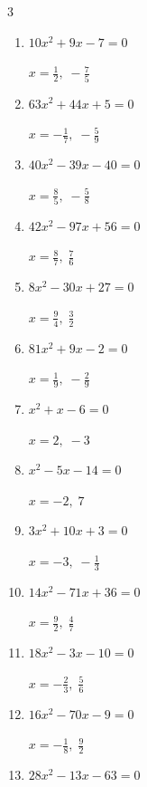 \begin{multicols}{3}
\begin{enumerate}
        $\displaystyle x=-\frac{7}{9},\; -2$

  \item $10x^{2}+9x-7=0$

        $\displaystyle x=\frac{1}{2},\; -\frac{7}{5}$

  \item $63x^{2}+44x+5=0$

        $\displaystyle x=-\frac{1}{7},\; -\frac{5}{9}$

  \item $40x^{2}-39x-40=0$

        $\displaystyle x=\frac{8}{5},\; -\frac{5}{8}$

  \item $42x^{2}-97x+56=0$

        $\displaystyle x=\frac{8}{7},\; \frac{7}{6}$

  \item $8x^{2}-30x+27=0$

        $\displaystyle x=\frac{9}{4},\; \frac{3}{2}$

  \item $81x^{2}+9x-2=0$

        $\displaystyle x=\frac{1}{9},\; -\frac{2}{9}$

  \item $x^{2}+x-6=0$

        $\displaystyle x=2,\; -3$

\columnbreak %

  \item $x^{2}-5x-14=0$

        $\displaystyle x=-2,\; 7$

  \item $3x^{2}+10x+3=0$

        $\displaystyle x=-3,\; -\frac{1}{3}$

  \item $14x^{2}-71x+36=0$

        $\displaystyle x=\frac{9}{2},\; \frac{4}{7}$

  \item $18x^{2}-3x-10=0$

        $\displaystyle x=-\frac{2}{3},\; \frac{5}{6}$

  \item $16x^{2}-70x-9=0$

        $\displaystyle x=-\frac{1}{8},\; \frac{9}{2}$

  \item $28x^{2}-13x-63=0$


\end{enumerate}
\end{multicols}
